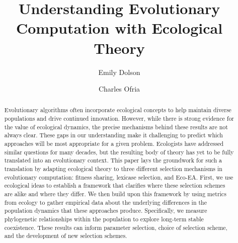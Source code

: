 \documentclass[sigconf]{acmart}
\begin{document}
\title{Understanding Evolutionary Computation with Ecological Theory}


\author{Emily Dolson}

\author{Charles Ofria}


\renewcommand{\shortauthors}{E. Dolson and C. Ofria}


\begin{abstract}
Evolutionary algorithms often incorporate ecological concepts to help maintain diverse populations and drive continued innovation. However, while there is strong evidence for the value of ecological dynamics, the precise mechanisms behind these results are not always clear. These gaps in our understanding make it challenging to predict which approaches will be most appropriate for a given problem. Ecologists have addressed similar questions for many decades, but the resulting body of theory has yet to be fully translated into an evolutionary context. This paper lays the groundwork for such a translation by adapting ecological theory to three different selection mechanisms in evolutionary computation: fitness sharing, lexicase selection, and Eco-EA. First, we use ecological ideas to establish a framework that clarifies where these selection schemes are alike and where they differ. We then build upon this framework by using metrics from ecology to gather empirical data about the underlying differences in the population dynamics that these approaches produce. Specifically, we measure phylogenetic relationships within the population to explore long-term stable coexistence. These results can inform parameter selection, choice of selection scheme, and the development of new selection schemes.

\end{abstract}
\end{document}
